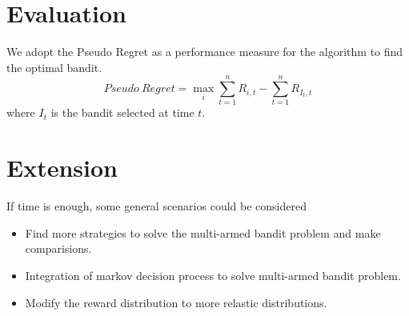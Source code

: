 \documentclass{article}
\begin{document}
\section{Evaluation}
We adopt the Pseudo Regret as a performance measure for the algorithm to find the optimal bandit.
$$ Pseudo \ Regret = \max_{i} \sum_{t=1}^{n} R_{i,t} - \sum_{t=1}^{n} R_{I_{t}, t}$$ where $I_{t}$ is the bandit selected at time $t$.
\section{Extension}
If time is enough, some general scenarios could be considered
\begin{itemize}
  \item Find more strategies to solve the multi-armed bandit problem and make comparisions.
  \item Integration of markov decision process to solve multi-armed bandit problem.
  \item Modify the reward distribution to more relastic distributions.
\end{itemize}
\end{document}
